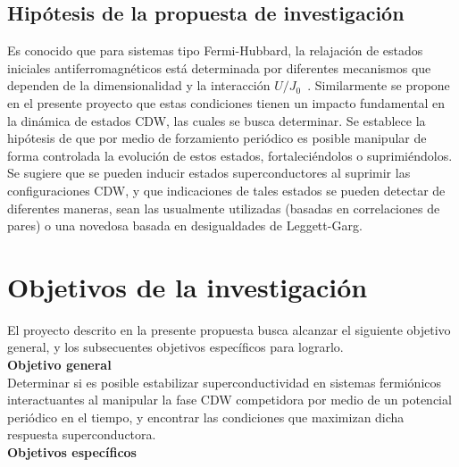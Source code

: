 \documentclass[a4paper,10pt]{article}
\begin{document}
\subsection{Hip\'otesis de la propuesta de investigaci\'on}
Es conocido que para sistemas tipo Fermi-Hubbard, la relajaci\'on de estados iniciales antiferromagn\'eticos est\'a determinada por diferentes mecanismos que dependen de la dimensionalidad y la interacci\'on $U/J_0$~\cite{heidrich_meisner2015pra,balzer2015prx}. Similarmente se propone en el presente proyecto que estas condiciones tienen un impacto fundamental en la din\'amica de estados CDW, las cuales se busca determinar. Se establece la hip\'otesis de que por medio de forzamiento peri\'odico es posible manipular de forma controlada la evoluci\'on de estos estados, fortaleci\'endolos o suprimi\'endolos. Se sugiere que se pueden inducir estados superconductores al suprimir las configuraciones CDW, y que indicaciones de tales estados se pueden detectar de diferentes maneras, sean las usualmente utilizadas (basadas en correlaciones de pares) o una novedosa basada en desigualdades de Leggett-Garg.

\section{Objetivos de la investigaci\'on}

El proyecto descrito en la presente propuesta busca alcanzar el siguiente objetivo general, y los subsecuentes objetivos espec\'ificos para lograrlo.\\

\textbf{Objetivo general}\\
Determinar si es posible estabilizar superconductividad en sistemas fermi\'onicos interactuantes al manipular la fase CDW competidora por medio de un potencial peri\'odico en el tiempo, y encontrar las condiciones que maximizan dicha respuesta superconductora.\\

\textbf{Objetivos espec\'{i}ficos}
\end{document}
